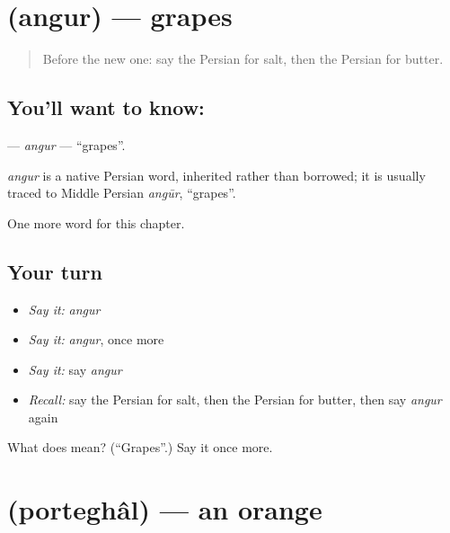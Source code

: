 \section[\texorpdfstring{\fa{انگور} (angur)}{انگور (angur)}]{ (angur) — grapes}

\label{lesson:FA-C42-angur}



\begin{quote}
Before the new one: say the Persian for salt, then the Persian for butter.
\end{quote}

\subsection*{You'll want to know: }
\textbf{} — \emph{angur} — \textquotedblleft{}grapes\textquotedblright{}.

\begin{cousinweb}
\emph{angur} is a native Persian word, inherited rather than borrowed; it is usually traced to Middle Persian \emph{angūr}, \textquotedblleft{}grapes\textquotedblright{}.
\end{cousinweb}

\begin{grammarlens}[title={What you've built}]
One more word for this chapter.
\end{grammarlens}

\subsection*{Your turn}
\begin{itemize}
\raggedright
  \item \emph{Say it:} \emph{angur}
  \item \emph{Say it:} \emph{angur}, once more
  \item \emph{Say it:} say \emph{angur}
  \item \emph{Recall:} say the Persian for salt, then the Persian for butter, then say \emph{angur} again
\end{itemize}

\begin{tcolorbox}[breakable,colback=teal!4,colframe=teal!35!black,title={Before you move on}]
What does  mean? (\textquotedblleft{}Grapes\textquotedblright{}.) Say it once more.
\end{tcolorbox}
\section[\texorpdfstring{\fa{پرتقال} (porteghâl)}{پرتقال (porteghâl)}]{ (porteghâl) — an orange}

